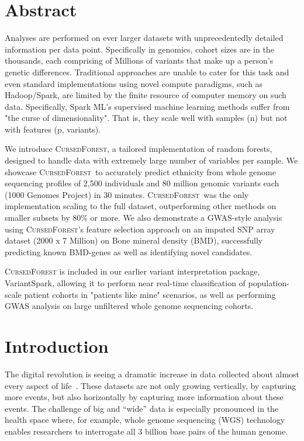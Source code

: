 \documentclass[10pt,letterpaper]{article}
\newcommand{\cursedforest}{\textsc{CursedForest}\xspace}
\begin{document}

\section{Abstract}

Analyses are performed on ever larger datasets with unprecedentedly detailed information per data point. Specifically in genomics, cohort sizes are in the thousands, each comprising of Millions of variants that make up a person's genetic differences. Traditional approaches are unable to cater for this task and even standard implementations using novel compute paradigms, such as Hadoop/Spark, are limited by the finite resource of computer memory on such data. Specifically, Spark ML's supervised machine learning methods suffer from "the curse of dimensionality". That is, they scale well with samples (n) but not with features (p, variants).

We introduce \cursedforest, a tailored implementation of random forests, designed to handle data with extremely large number of variables per sample. We showcase \cursedforest\ to accurately predict ethnicity from whole genome sequencing profiles of 2,500 individuals and 80 million genomic variants each (1000 Genomes Project) in 30 minutes. \cursedforest\ was the only implementation scaling to the full dataset, outperforming other methods on smaller subsets by 80\% or more. We also demonstrate a GWAS-style analysis using  \cursedforest's feature selection approach on an imputed SNP array dataset (2000 x 7 Million) on Bone mineral density (BMD), successfully predicting known BMD-genes as well as identifying novel candidates.  

\cursedforest is included in our earlier variant interpretation package, VariantSpark, allowing it to perform near real-time classification of population-scale patient cohorts in "patients like mine" scenarios, as well as performing GWAS analysis on large unfiltered whole genome sequencing cohorts. 





\linenumbers

\section{Introduction}
The digital revolution is seeing a dramatic increase in data collected about almost every aspect of
life~\cite{Loebbecke2015}.  These datasets are not only growing vertically, by capturing more events, but also
horizontally by capturing more information about these events.  The challenge of big and ``wide'' data is especially
pronounced in the health space where, for example, whole genome sequencing (WGS) technology enables researchers to
interrogate all 3 billion base pairs of the human genome.
\end{document}
